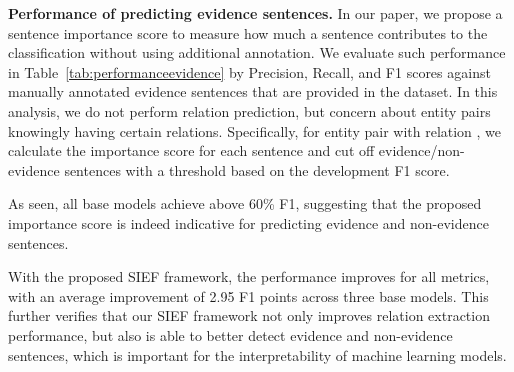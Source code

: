 \documentclass[11pt]{article}
\begin{document}
\begin{table}[!t]
\centering
{}
\caption{Results of Intra-F1 results and Infer-F1 on development set of DocRED. The difference is compared between SIEF and the respective base model.}
\label{tab:reasonperformance}
\end{table}


\textbf{Performance of predicting evidence sentences.} 
In our paper, we propose a sentence importance score to measure how much a sentence contributes to the classification without using additional annotation. We evaluate such performance in Table~\ref{tab:performanceevidence} by Precision, Recall, and F1 scores against manually annotated evidence sentences that are provided in the dataset. In this analysis, we do not perform relation prediction, but concern about entity pairs knowingly having certain relations.
Specifically, for entity pair  with relation , we calculate the importance score  for each sentence and cut off evidence/non-evidence sentences with a threshold based on the development F1 score. 

As seen, all base models achieve above 60\% F1, suggesting that the proposed importance score is indeed indicative for predicting evidence and non-evidence sentences.

With the proposed SIEF framework, the performance improves for all metrics, with an average improvement of 2.95 F1 points across three base models.
This further verifies that our SIEF framework not only improves relation extraction performance, but also is able to better detect evidence and non-evidence sentences, which is important for the interpretability of machine learning models.
\end{document}
